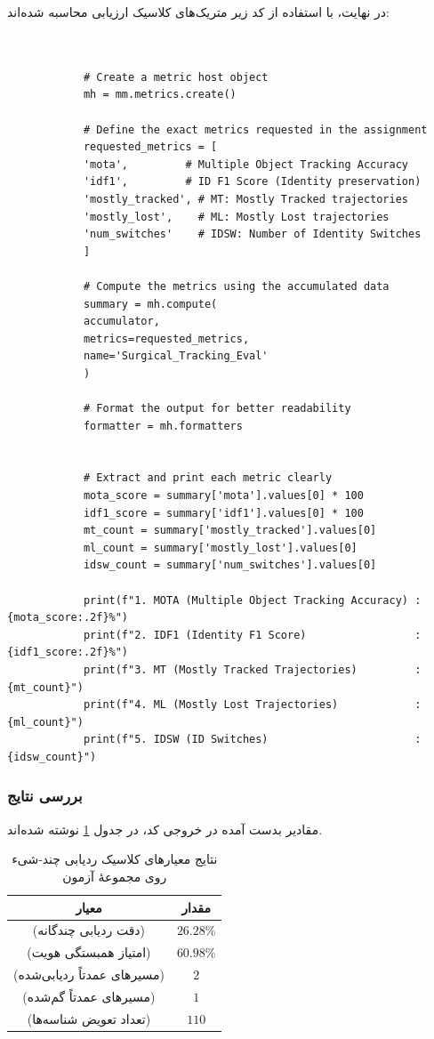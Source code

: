 \documentclass{article}
\begin{document}
در نهایت، با استفاده از کد زیر متریک‌های کلاسیک ارزیابی محاسبه شده‌اند:
\begin{latin}
	\begin{LTR}
		\begin{verbatim}
			
			
			# Create a metric host object
			mh = mm.metrics.create()
			
			# Define the exact metrics requested in the assignment
			requested_metrics = [
			'mota',         # Multiple Object Tracking Accuracy
			'idf1',         # ID F1 Score (Identity preservation)
			'mostly_tracked', # MT: Mostly Tracked trajectories
			'mostly_lost',    # ML: Mostly Lost trajectories
			'num_switches'    # IDSW: Number of Identity Switches
			]
			
			# Compute the metrics using the accumulated data
			summary = mh.compute(
			accumulator,
			metrics=requested_metrics,
			name='Surgical_Tracking_Eval'
			)
			
			# Format the output for better readability
			formatter = mh.formatters
			
			
			# Extract and print each metric clearly
			mota_score = summary['mota'].values[0] * 100
			idf1_score = summary['idf1'].values[0] * 100
			mt_count = summary['mostly_tracked'].values[0]
			ml_count = summary['mostly_lost'].values[0]
			idsw_count = summary['num_switches'].values[0]
			
			print(f"1. MOTA (Multiple Object Tracking Accuracy) : {mota_score:.2f}%")
			print(f"2. IDF1 (Identity F1 Score)                 : {idf1_score:.2f}%")
			print(f"3. MT (Mostly Tracked Trajectories)         : {mt_count}")
			print(f"4. ML (Mostly Lost Trajectories)            : {ml_count}")
			print(f"5. IDSW (ID Switches)                       : {idsw_count}")
		\end{verbatim}
	\end{LTR}
\end{latin}

\subsubsection{بررسی نتایج}
مقادیر بدست آمده در خروجی کد، در جدول \ref{tab:mot_metrics} نوشته شده‌اند.
\begin{table}[H]
	\centering
	\renewcommand{\arraystretch}{1.35}
	\begin{tabular}{@{}cc@{}}
		\toprule
		\textbf{معیار} & \textbf{مقدار} \\
		\midrule
		\lr{MOTA} (دقت ردیابی چندگانه)          & $26.28\%$ \\
		\lr{IDF1} (امتیاز همبستگی هویت)         & $60.98\%$ \\
		\lr{MT} (مسیرهای عمدتاً ردیابی‌شده)     & $2$ \\
		\lr{ML} (مسیرهای عمدتاً گم‌شده)         & $1$ \\
		\lr{IDSW} (تعداد تعویض شناسه‌ها)        & $110$ \\
		\bottomrule
	\end{tabular}
	\caption{نتایج معیارهای کلاسیک ردیابی چند‑شیء روی مجموعۀ آزمون}
	\label{tab:mot_metrics}
\end{table}
\end{document}
